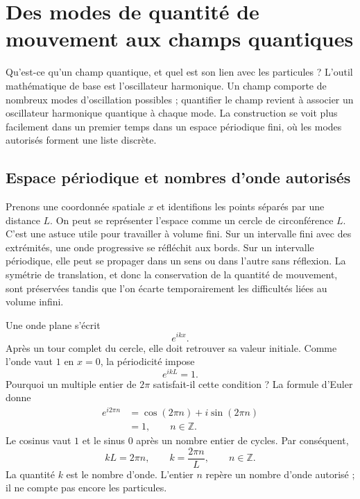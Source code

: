 \chapter{Des modes de quantité de mouvement aux champs quantiques}

Qu’est-ce qu’un champ quantique, et quel est son lien avec les particules ? L’outil mathématique de base est l’oscillateur harmonique. Un champ comporte de nombreux modes d’oscillation possibles ; quantifier le champ revient à associer un oscillateur harmonique quantique à chaque mode. La construction se voit plus facilement dans un premier temps dans un espace périodique fini, où les modes autorisés forment une liste discrète.

\section{Espace périodique et nombres d’onde autorisés}

Prenons une coordonnée spatiale \(x\) et identifions les points séparés par une distance \(L\). On peut se représenter l’espace comme un cercle de circonférence \(L\). C’est une astuce utile pour travailler à volume fini. Sur un intervalle fini avec des extrémités, une onde progressive se réfléchit aux bords. Sur un intervalle périodique, elle peut se propager dans un sens ou dans l’autre sans réflexion. La symétrie de translation, et donc la conservation de la quantité de mouvement, sont préservées tandis que l’on écarte temporairement les difficultés liées au volume infini.

Une onde plane s’écrit
\begin{equation}
e^{ikx}.
\end{equation}
Après un tour complet du cercle, elle doit retrouver sa valeur initiale. Comme l’onde vaut \(1\) en \(x=0\), la périodicité impose
\begin{equation}
e^{ikL}=1.
\end{equation}
Pourquoi un multiple entier de \(2\pi\) satisfait-il cette condition ? La formule d’Euler donne
\begin{align}
e^{i2\pi n}
&=\cos(2\pi n)+i\sin(2\pi n)\\
&=1,
\qquad n\in\mathbb Z.
\end{align}
Le cosinus vaut \(1\) et le sinus \(0\) après un nombre entier de cycles. Par conséquent,
\begin{equation}
kL=2\pi n,
\qquad
k=\frac{2\pi n}{L},
\qquad n\in\mathbb Z.
\end{equation}
La quantité \(k\) est le nombre d’onde. L’entier \(n\) repère un nombre d’onde autorisé ; il ne compte pas encore les particules.


